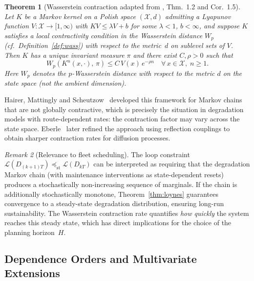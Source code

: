 \documentclass[11pt,a4paper]{article}
\theoremstyle{plain}
\newtheorem{theorem}{Theorem}[section]
\theoremstyle{definition}
\theoremstyle{remark}
\newtheorem{remark}[theorem]{Remark}
\begin{document}
\begin{theorem}[Wasserstein contraction {adapted from \cite{hairer2011}, Thm.~1.2 and Cor.~1.5}]
\label{thm:wasserstein}
Let $K$ be a Markov kernel on a Polish space $(\mathcal{X}, d)$ admitting a Lyapunov
function $V \colon \mathcal{X} \to [1, \infty)$ with $KV \leq \lambda V + b$ for some
$\lambda < 1$, $b < \infty$, and suppose $K$ satisfies a local contractivity condition
in the Wasserstein distance $W_p$ (cf.\ Definition~\ref{def:wass}) with respect to the
metric~$d$ on sublevel sets of $V$.  Then $K$ has a unique invariant measure $\pi$ and
there exist $C, \rho > 0$ such that
\begin{equation}
  W_p(K^n(x, \cdot),\, \pi) \leq C\, V(x)\, e^{-\rho n}
  \quad \forall\, x \in \mathcal{X},\; n \geq 1.
\end{equation}
Here $W_p$ denotes the $p$-Wasserstein distance with respect to the metric $d$ on the
state space (not the ambient dimension).
\end{theorem}

Hairer, Mattingly and Scheutzow~\cite{hairer2011} developed this
framework for Markov chains that are not globally contractive, which is precisely the
situation in degradation models with route-dependent rates: the contraction factor may
vary across the state space.  Eberle~\cite{eberle2016} later refined the approach
using reflection couplings to obtain sharper contraction rates for diffusion processes.

\begin{remark}[Relevance to fleet scheduling]
\label{rem:fleet_ergodic}
The loop constraint $\mathcal{L}(D_{(k+1)T}) \preceq_{\mathrm{st}}
\mathcal{L}(D_{kT})$ can be interpreted as requiring that the degradation Markov
chain (with maintenance interventions as state-dependent resets) produces a
stochastically non-increasing sequence of marginals.  If the chain is additionally
stochastically monotone, Theorem~\ref{thm:loynes} guarantees convergence to a
steady-state degradation distribution, ensuring long-run sustainability.  The
Wasserstein contraction rate quantifies \emph{how quickly} the system reaches this
steady state, which has direct implications for the choice of the planning horizon~$H$.
\end{remark}

\subsection{Dependence Orders and Multivariate Extensions}
\label{sec:micro:dependence}
\end{document}

